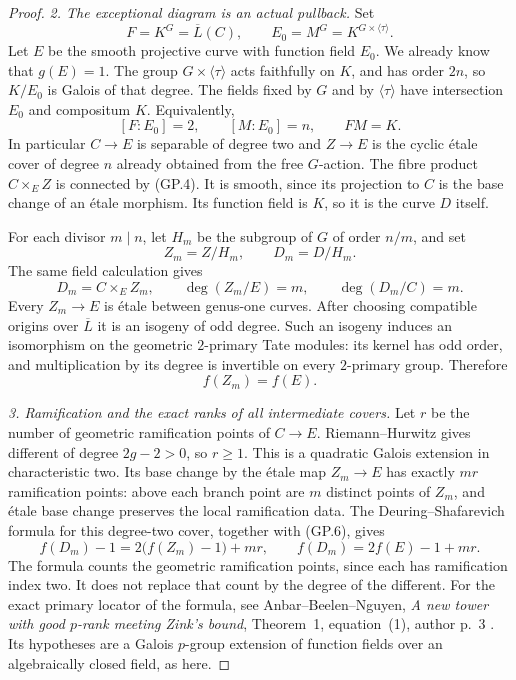 \documentclass[11pt,a4paper]{article}
\begin{document}
\begin{proof}
\emph{2. The exceptional diagram is an actual pullback.}
Set
\[
 F=K^G=\overline L(C),\qquad
 E_0=M^G=K^{G\times\langle\tau\rangle}.
\]
Let $E$ be the smooth projective curve with function field $E_0$.
We already know that $g(E)=1$.
The group $G\times\langle\tau\rangle$ acts faithfully on $K$,
and has order $2n$, so
$K/E_0$ is Galois of that degree.  The fields fixed by
$G$ and by $\langle\tau\rangle$ have intersection $E_0$ and
compositum $K$.  Equivalently,
\[
       [F:E_0]=2,\qquad [M:E_0]=n,\qquad FM=K.
 \tag{GP.4}
\]
In particular $C\to E$ is separable of degree two and
$Z\to E$ is the cyclic \'etale cover of degree $n$ already
obtained from the free $G$-action.
The fibre product $C\times_E Z$ is connected by (GP.4).
It is smooth, since its projection to $C$ is the base change
of an \'etale morphism.  Its function field is $K$, so it is
the curve $D$ itself.

For each divisor $m\mid n$, let $H_m$ be the subgroup of $G$
of order $n/m$, and set
\[
       Z_m=Z/H_m,\qquad D_m=D/H_m.
\]
The same field calculation gives
\[
        D_m=C\times_E Z_m,\qquad
        \deg(Z_m/E)=m,\qquad \deg(D_m/C)=m.
 \tag{GP.5}
\]
Every $Z_m\to E$ is \'etale between genus-one curves.
After choosing compatible origins over $\overline L$ it is
an isogeny of odd degree.  Such an isogeny induces an
isomorphism on the geometric $2$-primary Tate modules:
its kernel has odd order, and multiplication by its degree
is invertible on every $2$-primary group.  Therefore
\[
                              f(Z_m)=f(E).
 \tag{GP.6}
\]

\emph{3. Ramification and the exact ranks of all intermediate covers.}
Let $r$ be the number of geometric ramification points of
$C\to E$.  Riemann--Hurwitz gives different of degree
$2g-2>0$, so $r\ge1$.  This is a quadratic Galois extension
in characteristic two.  Its base change by the \'etale map
$Z_m\to E$ has exactly $mr$ ramification points: above each
branch point are $m$ distinct points of $Z_m$, and \'etale
base change preserves the local ramification data.
The Deuring--Shafarevich formula for this degree-two cover,
together with (GP.6), gives
\[
             f(D_m)-1=2\bigl(f(Z_m)-1\bigr)+mr,
 \qquad
             f(D_m)=2f(E)-1+mr.
 \tag{GP.7}
\]
The formula counts the geometric ramification points, since
each has ramification index two.  It does not replace that
count by the degree of the different.
For the exact primary locator of the formula, see
Anbar--Beelen--Nguyen,
\emph{A new tower with good $p$-rank meeting Zink's bound},
Theorem~1, equation~(1), author p.~3 \cite{AnbarBeelenNguyenP}.
Its hypotheses are a Galois $p$-group extension of function
fields over an algebraically closed field, as here.


\end{proof}
\end{document}

